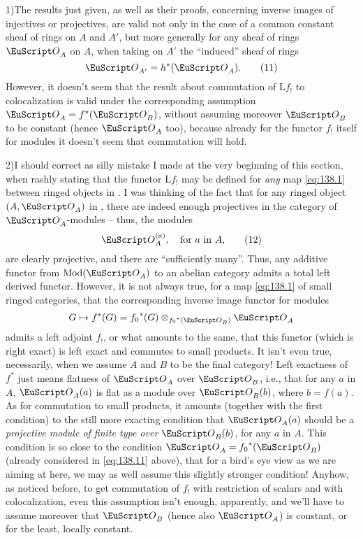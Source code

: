 \begin{remarks}
  1)\enspace The results just given, as well as their proofs,
  concerning inverse images of injectives or projectives, are valid
  not only in the case of a common constant sheaf of rings on $A$ and
  $A'$, but more generally for any sheaf of rings $\scrO_A$ on $A$,
  when taking on $A'$ the ``induced'' sheaf of rings
  \begin{equation}
    \label{eq:138.11}
    \scrO_{A'} = h^*(\scrO_A).\tag{11}
  \end{equation}
  However, it doesn't seem that the result about commutation of
  $\mathrm Lf_!$ to colocalization is valid under the corresponding
  assumption $\scrO_A=f^*(\scrO_B)$, without assuming moreover
  $\scrO_B$ to be constant (hence $\scrO_A$ too), because already for
  the functor $f_!$ itself for modules it doesn't seem that
  commutation will hold.

  2)\enspace I should correct as silly mistake I made at the very
  beginning of this section, when rashly stating that the functor
  $\mathrm Lf_!$ may be defined for \emph{any} map \eqref{eq:138.1}
  between ringed objects in \Cat. I was thinking of the fact that for
  any ringed object $(A,\scrO_A)$ in \Cat, there are indeed enough
  projectives in the category of $\scrO_A$-modules --
  thus, the modules
  \begin{equation}
    \label{eq:138.12}
    \scrO_A^{(a)}, \quad\text{for $a$ in $A$,}\tag{12}
  \end{equation}
  are clearly projective, and there are ``sufficiently many''. Thus,
  any additive functor from $\Mod(\scrO_A)$ to an abelian category
  admits a total left derived functor. However, it is not always true,
  for a map \eqref{eq:138.1} of small ringed categories, that the
  corresponding inverse image functor for modules
  \[G\mapsto f^*(G) = {f_0}^*(G) \otimes_{{f_0}^*(\scrO_B)} \scrO_A\]
  admits a left adjoint $f_!$, or what amounts to the same, that this
  functor (which is right exact) is left exact and commutes to small
  products. It isn't even true, necessarily, when we assume $A$ and
  $B$ to be the final category! Left exactness of $f^*$ just means
  flatness of $\scrO_A$ over $\scrO_B$, i.e., that for any $a$ in $A$,
  $\scrO_A(a)$ is flat as a module over $\scrO_B(b)$, where
  $b=f(a)$. As for commutation to small products, it amounts (together
  with the first condition) to the still more exacting condition that
  $\scrO_A(a)$ should be a \emph{projective module of finite type over
    $\scrO_B(b)$}, for any $a$ in $A$. This condition is so close to
  the condition $\scrO_A={f_0}^*(\scrO_B)$ (already considered in
  \eqref{eq:138.11} above), that for a bird's eye view as we are
  aiming at here, we may as well assume this slightly stronger
  condition! Anyhow, as noticed before, to get commutation of $f_!$
  with restriction of scalars and with colocalization, even this
  assumption isn't enough, apparently, and we'll have to assume
  moreover that $\scrO_B$ (hence also $\scrO_A$) is constant, or for
  the least, locally constant.


\end{remarks}
